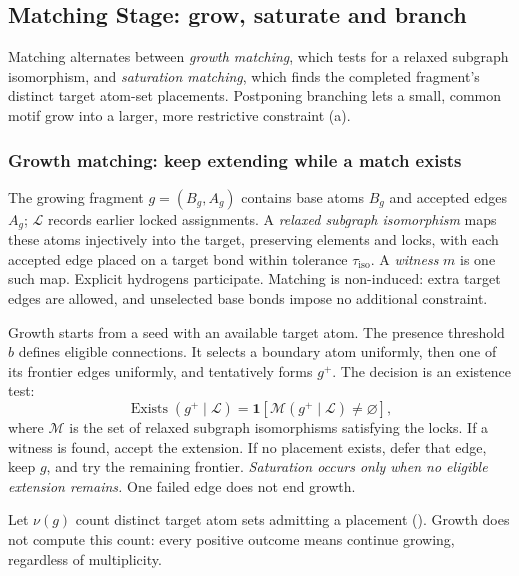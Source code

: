 \subsection{Matching Stage: grow, saturate and branch}
\label{sec:matching-rules}

Matching alternates between \emph{growth matching}, which tests for a relaxed subgraph isomorphism, and \emph{saturation matching}, which finds the completed fragment's distinct target atom-set placements. Postponing branching lets a small, common motif grow into a larger, more restrictive constraint (a).

\subsubsection{Growth matching: keep extending while a match exists}
\label{sec:growth}

The growing fragment $g=(B_g,A_g)$ contains base atoms $B_g$ and accepted edges $A_g$; $\mathcal L$ records earlier locked assignments. A \emph{relaxed subgraph isomorphism} maps these atoms injectively into the target, preserving elements and locks, with each accepted edge placed on a target bond within tolerance $\tau_{\mathrm{iso}}$. A \emph{witness} $m$ is one such map. Explicit hydrogens participate. Matching is non-induced: extra target edges are allowed, and unselected base bonds impose no additional constraint.

Growth starts from a seed with an available target atom. The presence threshold $b$ defines eligible connections. It selects a boundary atom uniformly, then one of its frontier edges uniformly, and tentatively forms $g^+$. The decision is an existence test:
\begin{equation}
 \operatorname{Exists}(g^+\mid\mathcal L)
 =\mathbf{1}\!\left[\mathcal M(g^+\mid\mathcal L)\ne\varnothing\right],
 \label{eq:growth-exists}
\end{equation}
where $\mathcal M$ is the set of relaxed subgraph isomorphisms satisfying the locks. If a witness is found, accept the extension. If no placement exists, defer that edge, keep $g$, and try the remaining frontier. \emph{Saturation occurs only when no eligible extension remains.} One failed edge does not end growth.

Let $\nu(g)$ count distinct target atom sets admitting a placement (). Growth does not compute this count: every positive outcome means continue growing, regardless of multiplicity.

